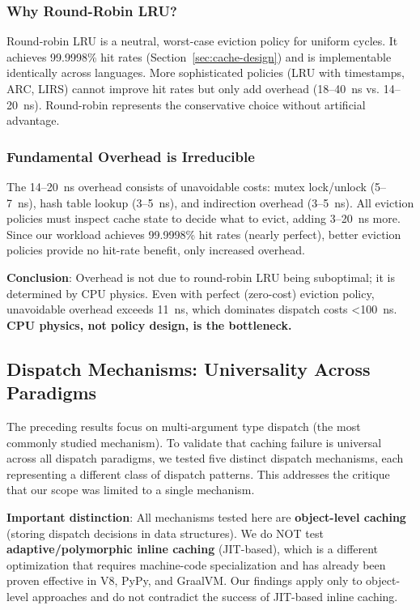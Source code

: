 \documentclass[sigplan,final,acmsmall,review,screen]{acmart}
\begin{document}
\subsubsection{Why Round-Robin LRU?}

Round-robin LRU is a neutral, worst-case eviction policy for uniform cycles. It achieves 99.9998\% hit rates (Section~\ref{sec:cache-design}) and is implementable identically across languages. More sophisticated policies (LRU with timestamps, ARC, LIRS) cannot improve hit rates but only add overhead (18--40~ns vs. 14--20~ns). Round-robin represents the conservative choice without artificial advantage.

\subsubsection{Fundamental Overhead is Irreducible}

The 14--20~ns overhead consists of unavoidable costs: mutex lock/unlock (5--7~ns), hash table
lookup (3--5~ns), and indirection overhead (3--5~ns). All eviction policies must inspect cache
state to decide what to evict, adding 3--20~ns more. Since our workload achieves 99.9998\% hit rates
(nearly perfect), better eviction policies provide no hit-rate benefit, only increased overhead.

\textbf{Conclusion}: Overhead is not due to round-robin LRU being suboptimal; it is determined by
CPU physics. Even with perfect (zero-cost) eviction policy, unavoidable overhead exceeds 11~ns,
which dominates dispatch costs <100~ns. \textbf{CPU physics, not policy design, is the bottleneck.}

\subsection{Dispatch Mechanisms: Universality Across Paradigms}
\label{sec:dispatch-mechanisms}

The preceding results focus on multi-argument type dispatch (the most commonly studied mechanism).
To validate that caching failure is universal across all dispatch paradigms, we tested five distinct
dispatch mechanisms, each representing a different class of dispatch patterns. This addresses the
critique that our scope was limited to a single mechanism.

\textbf{Important distinction}: All mechanisms tested here are \textbf{object-level caching} (storing
dispatch decisions in data structures). We do NOT test \textbf{adaptive/polymorphic inline caching}
(JIT-based), which is a different optimization that requires machine-code specialization and has
already been proven effective in V8, PyPy, and GraalVM. Our findings apply only to object-level
approaches and do not contradict the success of JIT-based inline caching.
\end{document}
